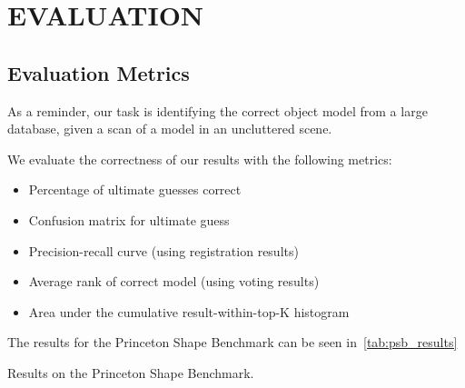 \section{EVALUATION}

\subsection{Evaluation Metrics}
As a reminder, our task is identifying the correct object model from a large database, given a scan of a model in an uncluttered scene.

We evaluate the correctness of our results with the following metrics:
\begin{itemize}
  \item Percentage of ultimate guesses correct
  \item Confusion matrix for ultimate guess
  \item Precision-recall curve (using registration results)
  \item Average rank of correct model (using voting results)
  \item Area under the cumulative result-within-top-K histogram
\end{itemize}

The results for the Princeton Shape Benchmark can be seen in~\ref{tab:psb_results}
\begin{table}
  \centering
  
  \caption{Results on the Princeton Shape Benchmark.}
  \label{tab:psb_results}
\end{table}


